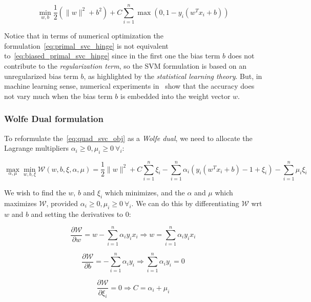 \begin{equation} \label{eq:biased_primal_svc_hinge}
    \min_{w,b} \frac{1}{2} (\| w \|^2 + b^2) + C \sum_{i=1}^n \max(0, 1 - y_i (w^T x_i + b))
\end{equation}

Notice that in terms of numerical optimization the formulation~\eqref{eq:primal_svc_hinge} is not equivalent to~\eqref{eq:biased_primal_svc_hinge} since in the first one the bias term $b$ does not contribute to the \emph{regularization term}, so the SVM formulation is based on an unregularized bias term $b$, as highlighted by the \emph{statistical learning theory}. But, in machine learning sense, numerical experiments in~\cite{hsu2002simple} show that the accuracy does not vary much when the bias term $b$ is embedded into the weight vector $w$.

\subsubsection{Wolfe Dual formulation}

To reformulate the~\eqref{eq:quad_svc_obj} as a \emph{Wolfe dual}, we need to allocate the Lagrange multipliers $\alpha_i\geq 0, \mu_i \geq 0 \ \forall_i$:

\begin{equation} \label{eq:svc_wolfe_dual}
    \max_{\alpha,\mu} \min_{w,b,\xi} \mathcal{W}(w,b,\xi,\alpha,\mu) = \frac{1}{2} \| w \|^2 + C \sum_{i=1}^n \xi_i-\sum_{i=1}^n \alpha_i(y_i(w^T x_i + b)-1+\xi_i)-\sum_{i=1}^n\mu_i\xi_i
\end{equation}

We wish to find the $w$, $b$ and $\xi_i$ which minimizes, and the $\alpha$ and $\mu$ which maximizes $\mathcal{W}$, provided $\alpha_i\geq 0, \mu_i \geq 0 \ \forall_i$. We can do this by differentiating $\mathcal{W}$ wrt $w$ and $b$ and setting the derivatives to 0:

\begin{equation} \label{eq:svc_wolfe_der_w}
	\frac{\partial \mathcal{W}}{\partial w}=w-\sum_{i=1}^n \alpha_i y_i x_i \Rightarrow w=\sum_{i=1}^n \alpha_i y_i x_i
\end{equation}

\begin{equation} \label{eq:svc_wolfe_der_b}
	\frac{\partial \mathcal{W}}{\partial b}=-\sum_{i=1}^n \alpha_i y_i\Rightarrow\sum_{i=1}^n \alpha_i y_i=0
\end{equation}

\begin{equation} \label{eq:svc_wolfe_der_xi}
	\frac{\partial \mathcal{W}}{\partial\xi_i}=0\Rightarrow C=\alpha_i+\mu_i
\end{equation}

